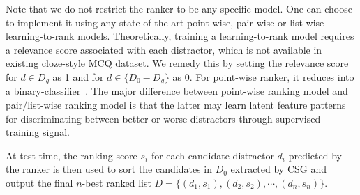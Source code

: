 Note that we do not restrict the ranker to be any specific model. 
One can choose to implement it using any state-of-the-art point-wise, 
pair-wise or list-wise learning-to-rank models. Theoretically, 
training a learning-to-rank model requires a relevance score associated with 
each distractor, which is not available in existing cloze-style 
MCQ dataset. We remedy this by setting the relevance score for $d\in D_g$ as 1 
and for $d\in \{D_0-D_g\}$ as 0. For point-wise ranker, 
it reduces into a binary-classifier~\cite{liang2018distractor}. 
The major difference between point-wise ranking model and 
pair/list-wise ranking model is that the latter may learn latent 
feature patterns for discriminating between better or worse distractors 
through supervised training signal.


At test time, the ranking score $s_i$ for each candidate distractor $d_i$ 
predicted by the ranker is then used to sort the candidates in 
$D_0$ extracted by CSG and output the final $n$-best ranked list 
$D = \{(d_1, s_1), (d_2, s_2), \cdots, (d_n, s_n) \}$.
